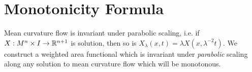 \section{Monotonicity Formula}
\begin{comment}
    Let $ X: M^{n} \times I \to \R^{n+1} $ be a one-parameter family of immersions flowing by mean curvature. Let $ \{x^{i}\} $ be local coordinates around a point $ p \in M $. Then the metric and second fundamental form is given by 
\[ g_{ij} = \left< \frac{\dou X}{\dou x^{i}}, \frac{\dou X}{\dou x^{j}} \right> , \qquad h_{ij} = \left<\nu, \frac{\partial^{2}X}{\dou x^{i}\dou x^{j}} \right>. \]

If we scale the solution by a factor of $ \lambda  $, defined by $ \tilde{X}(x,t) = \lambda X(x,t) $ we get the following metric and second fundamental form 

\[ \tilde{g_{ij}} = \left< \frac{\dou \tilde{X}}{\dou x^{i}}, \frac{\dou \tilde{X}}{\dou x^{j}} \right>  = \lambda^{2}g_{ij} ,\qquad \tilde{h_{ij}} = \left<\nu, \frac{\partial^{2}\tilde{X}}{\dou x^{i}\dou x^{j}} \right>  = \lambda h_{ij}\]
so the scaled mean curvature is given by $ \tilde{H} = \tilde{g}^{{ij}}\tilde{h}_{ij} = \frac{1}{\lambda}H $. This implies the scaled solutions satisfy the evolution equation

\[ \frac{\dou \tilde{X}}{\dou t} = \lambda \frac{\dou X}{\dou t} = -\lambda^{2}\tilde{H}\nu \]
or
\[ \frac{\dou \tilde{X}}{\dou (\lambda^{2}t)} = - \tilde{H}\nu \]
Hence if scale time by $ \lambda^{2} $, then $ \tilde{X} $ is also a solution of the mean curvature flow.
\end{comment}

Mean curvature flow is invariant under parabolic scaling, i.e.  if $ X : M^{n} \times I \to \mathbb{R}^{n+1} $ is solution, then so is $ X_{\lambda}(x,t) = \lambda X(x,\lambda^{-2}t) $. We construct a weighted area functional which is invariant under \textit{parabolic} scaling along any solution to mean curvature flow which will be monotonous.

